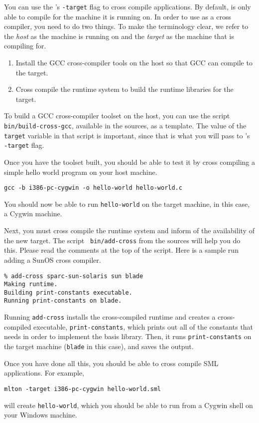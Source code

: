 
You can use the {\mlton}'s {\tt -target} flag to cross compile
applications.  By default, {\mlton} is only able to compile for the
machine it is running on.  In order to use {\mlton} as a cross
compiler, you need to do two things.  To make the terminology clear,
we refer to the {\em host} as the machine {\mlton} is running on and
the {\em target} as the machine that {\mlton} is compiling for.

\begin{enumerate}

\item Install the GCC cross-compiler tools on the host so that GCC can
compile to the target.

\item Cross compile the {\mlton} runtime system to build the runtime
libraries for the target.

\end{enumerate}

To build a GCC cross-compiler toolset on the host, you can use the
script {\tt bin/build-cross-gcc}, available in the {\mlton} sources,
as a template.  The value of the {\tt target} variable in that script
is important, since that is what you will pass to {\mlton}'s {\tt
-target} flag.

Once you have the toolset built, you should be able to test it by
cross compiling a simple hello world program on your host machine.
\begin{verbatim}
gcc -b i386-pc-cygwin -o hello-world hello-world.c
\end{verbatim}
You should now be able to run {\tt hello-world} on the target machine,
in this case, a Cygwin machine.

Next, you must cross compile the {\mlton} runtime system and inform
{\mlton} of the availability of the new target.  The script {\tt
bin/add-cross} from the {\mlton} sources will help you do this.
Please read the comments at the top of the script.  Here is a sample
run adding a SunOS cross compiler.
\begin{verbatim}
% add-cross sparc-sun-solaris sun blade
Making runtime.
Building print-constants executable.
Running print-constants on blade.
\end{verbatim}
Running {\tt add-cross} installs the cross-compiled runtime and
creates a cross-compiled executable, {\tt print-constants}, which
prints out all of the constants that {\mlton} needs in order to
implement the basis library.  Then, it runs {\tt print-constants} on
the target machine ({\tt blade} in this case), and saves the output.

Once you have done all this, you should be able to cross compile SML
applications.  For example,
\begin{verbatim}
mlton -target i386-pc-cygwin hello-world.sml
\end{verbatim}
will create {\tt hello-world}, which you should be able to run from a
Cygwin shell on your Windows machine.

